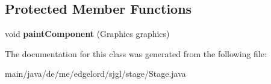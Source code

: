 \subsection*{Protected Member Functions}
\begin{DoxyCompactItemize}
\item 
\mbox{\label{classde_1_1me_1_1edgelord_1_1sjgl_1_1stage_1_1_stage_a6355bf55cb39b9bb5c5112f86decfb76}} 
void {\bfseries paint\+Component} (Graphics graphics)
\end{DoxyCompactItemize}


The documentation for this class was generated from the following file\+:\begin{DoxyCompactItemize}
\item 
main/java/de/me/edgelord/sjgl/stage/Stage.\+java\end{DoxyCompactItemize}

